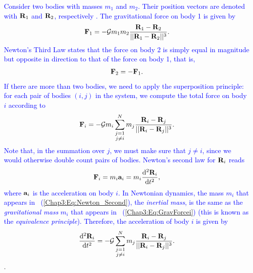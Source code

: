 \documentclass[main.tex]{subfiles}
\begin{document}
\begin{tcolorbox}[sharp corners, colback=blue!30, colframe=blue!80!blue, title=Orbital Dynamics Ib]
\par \textcolor{blue}{Consider two bodies with masses $m_1$ and $m_2$. Their position vectors are denoted with ${\mathbf{R}}_1$ and ${\mathbf{R}}_2$, respectively . The gravitational force on body 1 is given by
\begin{align}
\label{Chap3:Eq:F_1_vec}
{\mathbf{F}}_{1} = - \mathcal{G} m_1m_2 \frac{{\mathbf{R}}_1 - {\mathbf{R}}_2}{|| {\mathbf{R}}_1 - {\mathbf{R}}_2||^3}.
\end{align}
 Newton's Third Law states that the force on body 2 is simply equal in magnitude but opposite in direction to that of the force on body 1, that is,
\begin{align}
{\mathbf{F}}_{2} = - {\mathbf{F}}_{1}.
\end{align}
If there are more than two bodies, we need to apply the superposition principle: for each pair of bodies $(i,j)$ in the system, we compute the total force on body $i$ according to
\begin{align}
\label{Chap3:Eq:GravForcei}
{\mathbf{F}}_i = -\mathcal{G} m_i \sum_{\substack{j=1 \\ j\neq i}}^{N} m_j \frac{ {\mathbf{R}}_i - {\mathbf{R}}_j}{|| {\mathbf{R}}_i - {\mathbf{R}}_j||^3}.
\end{align}
Note that, in the summation over $j$, we must make sure that $j\neq i$, since we would otherwise double count pairs of bodies. Newton's second law for ${\mathbf{R}}_i$ reads
\begin{align}
\label{Chap3:Eq:Newton_Second}
{\mathbf{F}}_i = m_i {\mathbf{a}}_i = m_i \frac{\mathrm{d}^2 {\mathbf{R}}_i}{\mathrm{d} t^2},
\end{align}
where ${\mathbf{a}}_i$ is the acceleration on body $i$. In Newtonian dynamics, the mass $m_i$ that appears in \Eq~(\ref{Chap3:Eq:Newton_Second}), the {\it inertial mass}, is the same as the {\it gravitational mass} $m_i$ that appears in \Eq~(\ref{Chap3:Eq:GravForcei}) (this is known as the {\it equivalence principle}). Therefore, the acceleration of body $i$ is given by
\begin{align}
\label{Chap3:Eq:EOM}
\frac{\mathrm{d}^2 {\mathbf{R}}_i}{\mathrm{d} t^2} = - \mathcal{G} \sum_{\substack{j=1 \\ j\neq i}}^{N} m_j \frac{ {\mathbf{R}}_i - {\mathbf{R}}_j}{|| {\mathbf{R}}_i - {\mathbf{R}}_j||^3}.
\end{align}
}.  
\end{tcolorbox}
\end{document}
